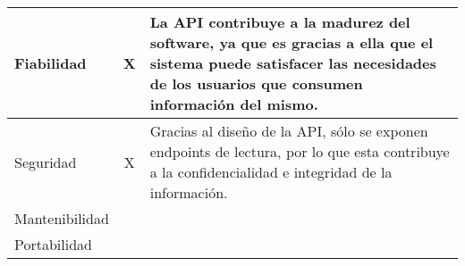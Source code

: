 \begin{center}
\begin{tabular}{ | p{2cm}| p{8cm} | p{5cm} |}
    \multicolumn{1}{|p{3.5cm}|}{\nohyphens{Fiabilidad}} & \multicolumn{1}{|c|}{X} & \multicolumn{1}{|p{10cm}|}{La API contribuye a la madurez del software, ya que es gracias a ella que el sistema puede satisfacer las necesidades de los usuarios que consumen información del mismo.} \\ \hline
    
    \multicolumn{1}{|p{3.5cm}|}{\nohyphens{Seguridad}} & \multicolumn{1}{|c|}{X} & \multicolumn{1}{|p{10cm}|}{Gracias al diseño de la API, sólo se exponen endpoints de lectura, por lo que esta contribuye a la confidencialidad e integridad de la información.} \\ \hline
    
    \multicolumn{1}{|p{3.5cm}|}{\nohyphens{Mantenibilidad}} & \multicolumn{1}{|c|}{} & \multicolumn{1}{|p{10cm}|}{} \\ \hline
    
    \multicolumn{1}{|p{3.5cm}|}{\nohyphens{Portabilidad}} & \multicolumn{1}{|c|}{} & \multicolumn{1}{|p{10cm}|}{} \\

    \hline
  \end{tabular}
\end{center}

